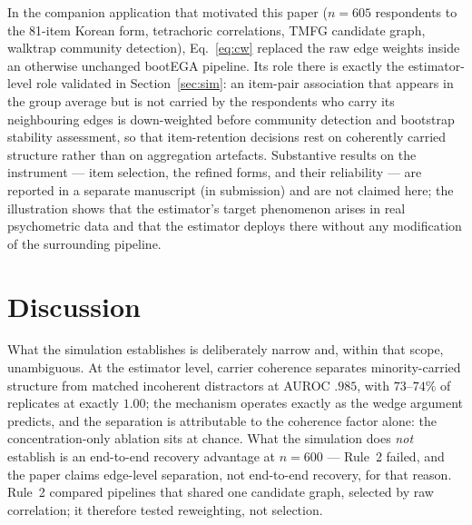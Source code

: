 \documentclass[11pt]{article}
\begin{document}
In the companion application that motivated this paper ($n=605$
respondents to the 81-item Korean form, tetrachoric correlations, TMFG
candidate graph, walktrap community detection), Eq.~\eqref{eq:cw}
replaced the raw edge weights inside an otherwise unchanged bootEGA
pipeline. Its role there is exactly the estimator-level role
validated in Section~\ref{sec:sim}: an item-pair association that
appears in the group average but is not carried by the respondents who
carry its neighbouring edges is down-weighted before community detection
and bootstrap stability assessment, so that item-retention decisions
rest on coherently carried structure rather than on aggregation
artefacts. Substantive results on the instrument --- item selection, the
refined forms, and their reliability --- are reported in a separate
manuscript (in submission) and are not claimed here; the illustration
shows that the estimator's target phenomenon arises in real psychometric
data and that the estimator deploys there without any modification of
the surrounding pipeline.

\section{Discussion}\label{sec:discussion}
What the simulation establishes is deliberately narrow and, within that
scope, unambiguous. At the estimator level, carrier coherence separates
minority-carried structure from matched incoherent distractors at AUROC
$.985$, with $73$--$74\%$ of replicates at exactly $1.00$; the mechanism
operates exactly as the wedge argument predicts,
and the separation is attributable to the coherence factor alone: the
concentration-only ablation sits at chance. What the simulation does \emph{not}
establish is an end-to-end recovery advantage at $n=600$ --- Rule~2 failed,
and the paper claims edge-level separation, not end-to-end recovery, for
that reason. Rule~2 compared pipelines that shared one candidate graph,
selected by raw correlation; it therefore tested reweighting, not
selection.
\end{document}
